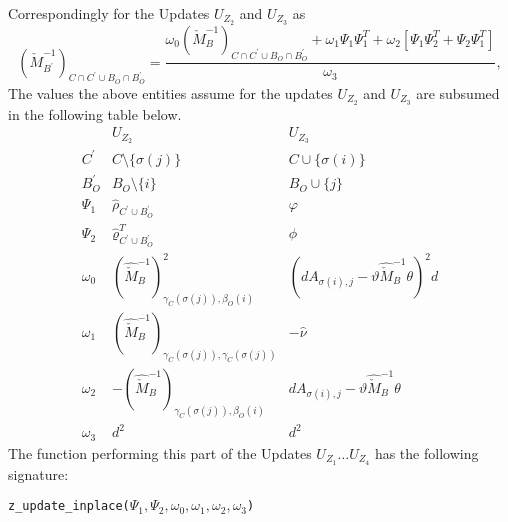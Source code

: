 \documentclass[a4paper]{article}
\begin{document}
Correspondingly for the Updates $U_{Z_{2}}$ and $U_{Z_{3}}$ as 
\begin{equation}
\left(
\check{M}_{B^{\prime}}^{-1}
\right)_{C \cap C^{\prime} \cup B_{O} \cap B_{O}^{\prime}}
=
\frac{
\omega_{0}
\left(
\check{M}_{B}^{-1}
\right)_{C \cap C^{\prime} \cup B_{O} \cap B_{O}^{\prime}}
+\omega_{1}\Psi_{1}\Psi_{1}^{T}
+\omega_{2}\left[\Psi_{1}\Psi_{2}^{T}+\Psi_{2}\Psi_{1}^{T}\right]
}{\omega_{3}},
\end{equation}
The values the above entities assume for the updates $U_{Z_{2}}$ and
$U_{Z_{3}}$ are subsumed in the following table below.
\begin{equation}
\begin{array}{c|cccc}
& U_{Z_{2}} & U_{Z_{3}} \\
\hline
C^{\prime}
& C \setminus \{\sigma(j)\}
& C \cup \{\sigma(i)\}
\\
B_{O}^{\prime}
& B_{O} \setminus \{i\}
& B_{O} \cup \{j\}
\\
\Psi_{1}
& \hat{\rho}_{C^{\prime} \cup B_{O}^{\prime}}
& \varphi
\\
\Psi_{2}
& \hat{\varrho}_{C^{\prime} \cup B_{O}^{\prime}}^{T}
& \phi
\\
\omega_{0}
& \left(
   \hat{\check{M}}_{B}^{-1}
  \right)_{\gamma_{C}(\sigma(j)), \beta_{O}(i)}^{2}
& \left(
   dA_{\sigma(i),j}-\vartheta\hat{\check{M}}_{B}^{-1}\theta
  \right)^{2} d
\\
\omega_{1}
& \left(
   \hat{\check{M}}_{B}^{-1}
  \right)_{\gamma_{C}(\sigma(j)), \gamma_{C}(\sigma(j))}
& -\hat{\nu}
\\
\omega_{2}
& -\left(
   \hat{\check{M}}_{B}^{-1}
  \right)_{\gamma_{C}(\sigma(j)), \beta_{O}(i)}
& d A_{\sigma(i), j}-\vartheta\hat{\check{M}}_{B}^{-1}\theta
\\
\omega_{3}
& d^{2}
& d^{2}
\end{array}
\end{equation}
The function performing this part of the Updates $U_{Z_{1}} \dots U_{Z_{4}}$
has the following signature:
\begin{tabbing}
\texttt{z\_update\_inplace($\Psi_{1}, \Psi_{2}, \omega_{0}, \omega_{1},
\omega_{2}, \omega_{3}$)}
\end{tabbing}
\end{document}
